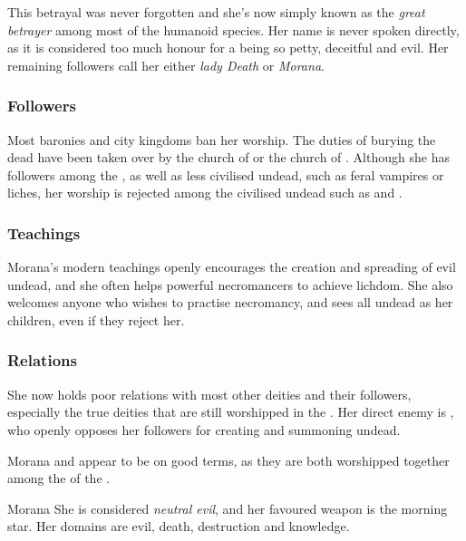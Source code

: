 This betrayal was never forgotten and she's now simply known as the
\emph{great betrayer} among most of the humanoid species. Her name is never
spoken directly, as it is considered too much honour for a being so petty,
deceitful and evil. Her remaining followers call her either \emph{lady Death}
or \emph{Morana}.

\subsubsection{Followers}

Most baronies and city kingdoms ban her worship. The duties of burying the
dead have been taken over by the church of  or the church
of . Although she has followers among the ,
as well as less civilised undead, such as feral vampires or liches, her worship
is rejected among the civilised undead such as  and
.

\subsubsection{Teachings}

Morana's modern teachings openly encourages the creation and spreading of
evil undead, and she often helps powerful necromancers to achieve lichdom.
She also welcomes anyone who wishes to practise necromancy, and sees all
undead as her children, even if they reject her.

\subsubsection{Relations}

She now holds poor relations with most other deities and their followers,
especially the true deities that are still worshipped in the
. Her direct enemy is , who openly
opposes her followers for creating and summoning undead.

Morana and  appear to be on good terms, as they are both
worshipped together among the  of the .

\begin{35e}{Morana}
  She is considered \emph{neutral evil}, and her favoured weapon is the
  morning star. Her domains are evil, death, destruction and knowledge.
\end{35e}
